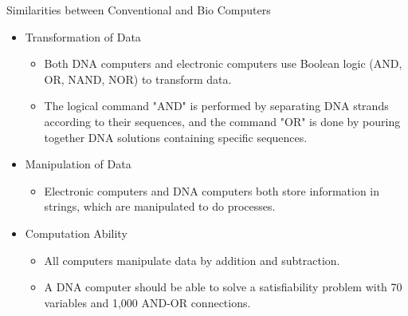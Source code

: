 \documentclass[10pt]{beamer}
\begin{document}
\begin{frame}{Similarities between Conventional and Bio Computers}
  \begin{itemize}
        \item {Transformation of Data
          \begin{itemize}
        \item Both DNA computers and electronic computers use Boolean logic (AND, OR, NAND, NOR) to transform data.
                \item The logical command "AND" is performed by separating DNA strands according to their sequences, and the command "OR" is done by pouring together DNA solutions containing specific sequences.
      \end{itemize}
            }
             \item {Manipulation of Data
          \begin{itemize}
        \item Electronic computers and DNA computers both store information in strings, which are manipulated to do processes. 
      \end{itemize}
            }
            \item {Computation Ability
              \begin{itemize}
          \item All computers manipulate data by addition and subtraction. 
                    \item A DNA computer should be able to solve a satisfiability problem with 70 variables and 1,000 AND-OR connections. 
        \end{itemize}
            }
  \end{itemize}
\end{frame}
\end{document}
